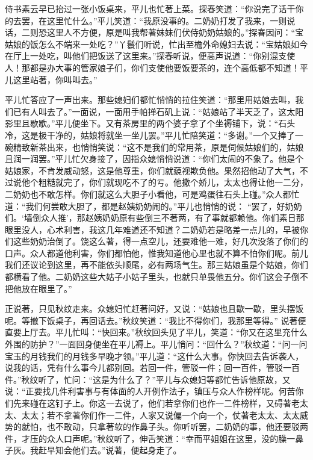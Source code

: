 \begin{parag}


    侍书素云早已抬过一张小饭桌来，平儿也忙著上菜。探春笑道：“你说完了话干你的去罢，在这里忙什么。”平儿笑道：“我原没事的。二奶奶打发了我来，一则说话，二则恐这里人不方便，原是叫我帮著妹妹们伏侍奶奶姑娘的。”探春因问：“宝姑娘的饭怎么不端来一处吃？”丫鬟们听说，忙出至檐外命媳妇去说：“宝姑娘如今在厅上一处吃，叫他们把饭送了这里来。”探春听说，便高声说道：“你别混支使人！那都是办大事的管家娘子们，你们支使他要饭要茶的，连个高低都不知道！平儿这里站著，你叫叫去。”
\end{parag}


\begin{parag}


    平儿忙答应了一声出来。那些媳妇们都忙悄悄的拉住笑道：“那里用姑娘去叫，我们已有人叫去了。”一面说，一面用手帕掸石矶上说：“姑娘站了半天乏了，这太阳影里且歇歇。”平儿便坐下。又有茶房里的两个婆子拿了个坐褥铺下，说：“石头冷，这是极干净的，姑娘将就坐一坐儿罢。”平儿忙陪笑道：“多谢。”一个又捧了一碗精致新茶出来，也悄悄笑说：“这不是我们的常用茶，原是伺候姑娘们的，姑娘且润一润罢。”平儿忙欠身接了，因指众媳悄悄说道：“你们太闹的不象了。他是个姑娘家，不肯发威动怒，这是他尊重，你们就藐视欺负他。果然招他动了大气，不过说他个粗糙就完了，你们就现吃不了的亏。他撒个娇儿，太太也得让他一二分，二奶奶也不敢怎样。你们就这么大胆子小看他，可是鸡蛋往石头上碰。”众人都忙道：“我们何尝敢大胆了，都是赵姨奶奶闹的。”平儿也悄悄的说： “罢了，好奶奶们。‘墙倒众人推’，那赵姨奶奶原有些倒三不著两，有了事就都赖他。你们素日那眼里没人，心术利害，我这几年难道还不知道？二奶奶若是略差一点儿的，早被你们这些奶奶治倒了。饶这么著，得一点空儿，还要难他一难，好几次没落了你们的口声。众人都道他利害，你们都怕他，惟我知道他心里也就不算不怕你们呢。前儿我们还议论到这里，再不能依头顺尾，必有两场气生。那三姑娘虽是个姑娘，你们都横看了他。二奶奶这些大姑子小姑子里头，也就只单畏他五分。你们这会子倒不把他放在眼里了。”
\end{parag}


\begin{parag}


    正说著，只见秋纹走来。众媳妇忙赶著问好，又说：“姑娘也且歇一歇，里头摆饭呢。等撤下饭桌子，再回话去。”秋纹笑道：“我比不得你们，我那里等得。” 说著便直要上厅去。平儿忙叫：“快回来。”秋纹回头见了平儿，笑道：“你又在这里充什么外围的防护？”一面回身便坐在平儿褥上。平儿悄问：“回什么？”秋纹道：“问一问宝玉的月钱我们的月钱多早晚才领。”平儿道：“这什么大事。你快回去告诉袭人，说我的话，凭有什么事今儿都别回。若回一件，管驳一件；回一百件，管驳一百件。”秋纹听了，忙问：“这是为什么了？”平儿与众媳妇等都忙告诉他原故，又说：“正要找几件利害事与有体面的人开例作法子，镇压与众人作榜样呢。何苦你们先来碰在这钉子上。你这一去说了，他们若拿你们也作一二件榜样，又碍著老太太、太太；若不拿著你们作一二件，人家又说偏一个向一个，仗著老太太、太太威势的就怕，也不敢动，只拿著软的作鼻子头。你听听罢，二奶奶的事，他还要驳两件，才压的众人口声呢。”秋纹听了，伸舌笑道：“幸而平姐姐在这里，没的臊一鼻子灰。我赶早知会他们去。”说著，便起身走了。
\end{parag}


